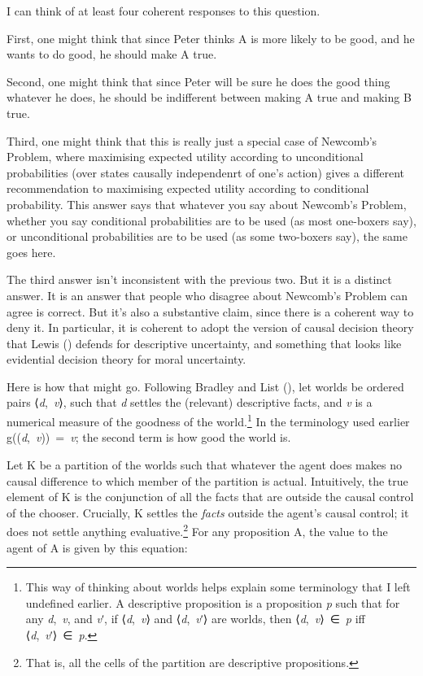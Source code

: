 \documentclass[
  10pt,
  letterpaper,
  DIV=11,
  numbers=noendperiod,
  twoside]{scrartcl}
\begin{document}
I can think of at least four coherent responses to this question.

First, one might think that since Peter thinks A is more likely to be
good, and he wants to do good, he should make A true.

Second, one might think that since Peter will be sure he does the good
thing whatever he does, he should be indifferent between making A true
and making B true.

Third, one might think that this is really just a special case of
Newcomb's Problem, where maximising expected utility according to
unconditional probabilities (over states causally independenrt of one's
action) gives a different recommendation to maximising expected utility
according to conditional probability. This answer says that whatever you
say about Newcomb's Problem, whether you say conditional probabilities
are to be used (as most one-boxers say), or unconditional probabilities
are to be used (as some two-boxers say), the same goes here.

The third answer isn't inconsistent with the previous two. But it is a
distinct answer. It is an answer that people who disagree about
Newcomb's Problem can agree is correct. But it's also a substantive
claim, since there is a coherent way to deny it. In particular, it is
coherent to adopt the version of causal decision theory that Lewis
() defends for descriptive uncertainty,
and something that looks like evidential decision theory for moral
uncertainty.

Here is how that might go. Following Bradley and List
(), let worlds be ordered pairs
⟨\emph{d},~\emph{v}⟩, such that \emph{d} settles the (relevant)
descriptive facts, and \emph{v} is a numerical measure of the goodness
of the world.\footnote{This way of thinking about worlds helps explain
  some terminology that I left undefined earlier. A descriptive
  proposition is a proposition \emph{p} such that for any
  \emph{d},~\emph{v}, and \emph{v}ʹ, if ⟨\emph{d},~\emph{v}⟩ and
  ⟨\emph{d},~\emph{v}ʹ⟩ are worlds, then ⟨\emph{d},~\emph{v}⟩~∈~\emph{p}
  iff ⟨\emph{d},~\emph{v}ʹ⟩~∈~\emph{p}.} In the terminology used earlier
g((\emph{d},~\emph{v}))~=~\emph{v}; the second term is how good the
world is.

Let K be a partition of the worlds such that whatever the agent does
makes no causal difference to which member of the partition is actual.
Intuitively, the true element of K is the conjunction of all the facts
that are outside the causal control of the chooser. Crucially, K settles
the \emph{facts} outside the agent's causal control; it does not settle
anything evaluative.\footnote{That is, all the cells of the partition
  are descriptive propositions.} For any proposition A, the value to the
agent of A is given by this equation:
\end{document}
